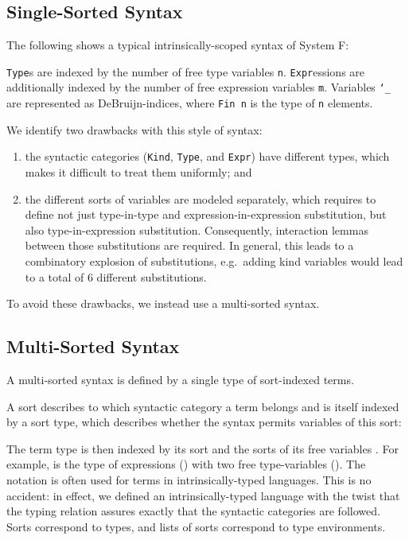 \documentclass[sigplan,10pt, anonymous]{acmart}
\newenvironment{LibCode*}{%
  \begin{tcolorbox}[%
    colframe=white,%
    boxrule=0.0pt,%
    top=2.5pt,%
    left=2.5pt,%
    bottom=2.5pt,%
    right=2.5pt,%
    boxsep=0pt%
  ]\vspace{-0.2\baselineskip}%
}{%
  \vspace{-1\baselineskip}%
  \end{tcolorbox}%
}
\newenvironment{ExampleCode*}{%
  \begin{tcolorbox}[%
    colframe=white,%
    colback=yellow!5,%
    boxrule=0.0pt,%
    top=2.5pt,%
    left=2.5pt,%
    bottom=2.5pt,%
    right=2.5pt,%
    boxsep=0pt%
  ]\vspace{-0.2\baselineskip}%
}{%
  \vspace{-1\baselineskip}%
  \end{tcolorbox}%
}
\newcommand*\LibCode[1]{\begin{LibCode*}{#1}\end{LibCode*}}
\newcommand*\AppCode[1]{{#1}}
\newcommand*\ExampleCode[1]{\begin{ExampleCode*}{#1}\end{ExampleCode*}}
\newcommand*\ACode[1]{\AgdaFontStyle{\textcolor{mygray}{#1}}}
\newcommand*\ACon[1]{\AgdaInductiveConstructor{#1}}
\begin{document}
  \subsection{Single-Sorted Syntax}
  The following shows a typical intrinsically-scoped syntax of System F:
  \ExampleCode\FUnsortedSyntax

  \texttt{Type}s are indexed by the number of free type variables \texttt{n}.
  \texttt{Expr}essions are additionally indexed by the number of free expression variables \texttt{m}.
  Variables \texttt{`\_} are represented as DeBruijn-indices, where \texttt{Fin n} is the type of \texttt{n} elements.

  We identify two drawbacks with this style of syntax:
  \begin{enumerate}
  \item the syntactic categories (\texttt{Kind}, \texttt{Type}, and \texttt{Expr})
    have different types, which makes it difficult to treat them uniformly; and
  \item the different sorts of variables are modeled separately, which requires to define not just
    type-in-type and expression-in-expression substitution, but also type-in-expression substitution.
    Consequently, interaction lemmas between those substitutions are required.
    In general, this leads to a combinatory explosion of
    substitutions, e.g.\ adding kind variables would lead to a total of 6
    different substitutions.
  \end{enumerate}
  To avoid these drawbacks, we instead use a multi-sorted syntax.

  \subsection{Multi-Sorted Syntax}
  A multi-sorted syntax is defined by a single type of sort-indexed terms.

  A sort describes to which syntactic category a term belongs and is
  itself indexed by a sort type, which describes whether the syntax
  permits variables of this sort:
  \LibCode\KSortTy
  \AppCode\FSort
  
  The term type \ACode{S \ACon{⊢} s} is then indexed by its sort
  \ACode{s} and the sorts of its free variables \ACode{S}.
  For example, \ACode{\ACon{[𝕥, 𝕥] ⊢ 𝕖}} is the type of expressions
  (\ACode{\ACon{𝕖}}) with two free type-variables (\ACode{\ACon{𝕥}}).
  \newpage
  \AppCode\FSyntax
  The notation \ACode{\ACon{\_⊢\_}} is often used for terms in
  intrinsically-typed languages. This is no accident: in effect, we
  defined an intrinsically-typed language with the twist that the
  typing relation assures exactly that the syntactic categories are followed.
  Sorts \ACode{s} correspond to types, and lists of sorts \ACode{S}
  correspond to type environments.
\end{document}

